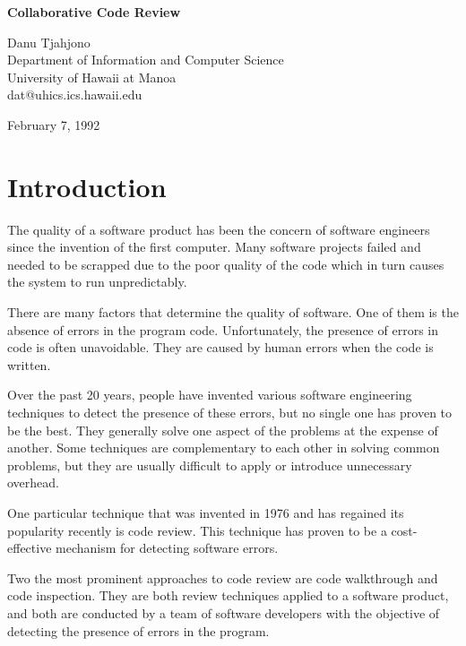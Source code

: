 


\begin {center} 
{\large\bf Collaborative Code Review}
\bigskip

Danu Tjahjono\\ 
Department of Information and Computer Science\\ 
University of Hawaii at Manoa\\ 
{\sf dat@uhics.ics.hawaii.edu}   
  
\medskip 
February 7, 1992
\end {center} 


\section {Introduction}
 
The quality of a software product has been the
concern of software engineers since the invention of the first
computer.  Many software projects failed and needed to be scrapped
due to the poor quality of the code which in turn causes the
system to run unpredictably.

There are many factors that
determine the  quality of software.
One of them is the absence of errors
in the program code.  Unfortunately, the presence of errors in code 
is often unavoidable.  They  are caused by human
errors when the code is written. 

Over the past 20 years, people have invented 
various software engineering techniques  to detect
the presence of these errors, but no single one
has proven to be the best.  They generally solve one aspect
of the problems at the expense of another.
Some techniques are complementary to each other in
solving  common problems, but they are usually difficult to apply
or introduce unnecessary overhead.

One particular technique that was invented in 1976
and  has regained its popularity
recently is code review.  This technique has proven  to be
a cost-effective mechanism for detecting software errors.

Two the most prominent approaches to code review are code
 walkthrough and code inspection.
They are both review techniques applied to a software product, and
both are conducted by a team of software developers with the objective of
detecting the presence of errors in the program.  

